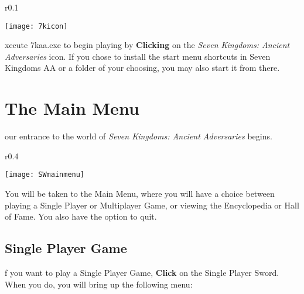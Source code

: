 \begin{wrapfigure}{r}{0.1\textwidth}
    \vspace{-20pt}
    \begin{center}
        \texttt{[image: 7kicon]}
    \end{center}
    \vspace{-20pt}
\end{wrapfigure}

xecute 7kaa.exe to begin playing by \textbf{Clicking} on the \textit{Seven Kingdoms: Ancient Adversaries} icon. If you chose to install the start menu shortcuts in Seven Kingdoms AA or a folder of your choosing, you may also start it from there.

\section{The Main Menu}


our entrance to the world of \textit{Seven Kingdoms: Ancient Adversaries} begins.

\begin{wrapfigure}{r}{0.4\textwidth}
    \begin{center}
        \vspace{-20pt}
        \texttt{[image: SWmainmenu]}
    \end{center}
    \vspace{-20pt}
\end{wrapfigure}


You will be taken to the Main Menu, where you will have a choice between playing a Single Player or Multiplayer Game, or viewing the Encyclopedia or Hall of Fame. You also have the option to quit.

\clearpage

\subsection{Single Player Game}


f you want to play a Single Player Game, \textbf{Click} on the Single Player Sword. When you do, you will bring up the following menu: 

